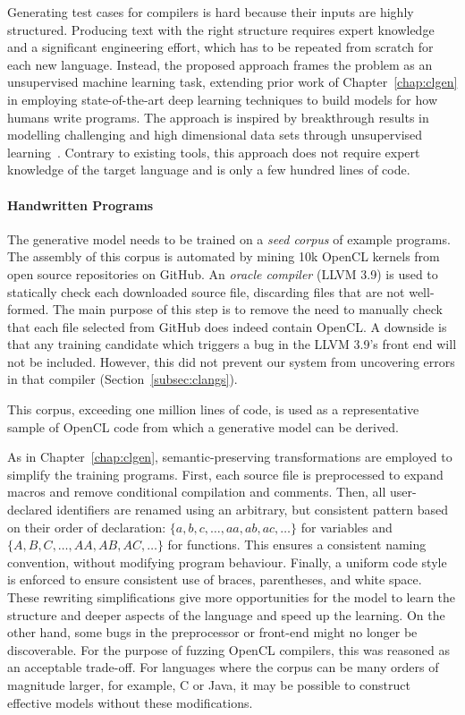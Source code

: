 Generating test cases for compilers is hard because their inputs are highly structured. Producing text with the right structure requires expert knowledge and a significant engineering effort, which has to be repeated from scratch for each new language. Instead, the proposed approach frames the problem as an unsupervised machine learning task, extending prior work of Chapter~\ref{chap:clgen} in employing state-of-the-art deep learning techniques to build models for how humans write programs. The approach is inspired by breakthrough results in modelling challenging and high dimensional data sets through unsupervised learning~\cite{Raghu2016,Radford2016b,Bowman2015}. Contrary to existing tools, this approach does not require expert knowledge of the target language and is only a few hundred lines of code.

\paragraph*{Handwritten Programs}

The generative model needs to be trained on a \emph{seed corpus} of example programs. The assembly of this corpus is automated by mining 10k OpenCL kernels from open source repositories on GitHub. An \emph{oracle compiler} (LLVM 3.9) is used to statically check each downloaded source file, discarding files that are not well-formed. The main purpose of this step is to remove the need to manually check that each file selected from GitHub does indeed contain OpenCL. A downside is that any training candidate which triggers a bug in the LLVM 3.9's front end will not be included. However, this did not prevent our system from uncovering errors in that compiler (Section~\ref{subsec:clangs}).

This corpus, exceeding one million lines of code, is used as a representative sample of OpenCL code from which a generative model can be derived.

As in Chapter~\ref{chap:clgen}, semantic-preserving transformations are employed to simplify the training programs. First, each source file is preprocessed to expand macros and remove conditional compilation and comments. Then, all user-declared identifiers are renamed using an arbitrary, but consistent pattern based on their order of declaration: $\{a,\allowbreak b,\allowbreak c,\allowbreak \ldots,\allowbreak aa,\allowbreak ab,\allowbreak ac,\allowbreak \ldots\}$ for variables and $\{A,\allowbreak B,\allowbreak C,\allowbreak \ldots,\allowbreak AA,\allowbreak AB,\allowbreak AC,\allowbreak \ldots\}$ for functions. This ensures a consistent naming convention, without modifying program behaviour. Finally, a uniform code style is enforced to ensure consistent use of braces, parentheses, and white space. These rewriting simplifications give more opportunities for the model to learn the structure and deeper aspects of the language and speed up the learning. On the other hand, some bugs in the preprocessor or front-end might no longer be discoverable. For the purpose of fuzzing OpenCL compilers, this was reasoned as an acceptable trade-off. For languages where the corpus can be many orders of magnitude larger, for example, C or Java, it may be possible to construct effective models without these modifications.


